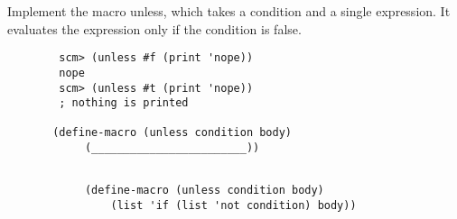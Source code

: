 \begin{blocksection}
    \question 
    Implement the macro unless, which takes a condition and a single expression.
    It evaluates the expression only if the condition is false.
    
    \begin{lstlisting}
        scm> (unless #f (print 'nope))
        nope
        scm> (unless #t (print 'nope))
        ; nothing is printed

       (define-macro (unless condition body)
            (________________________))

    \end{lstlisting}

    \begin{solution}[1in]
        \begin{lstlisting}

            (define-macro (unless condition body)
                (list 'if (list 'not condition) body))

        \end{lstlisting}
    \end{solution}
    
\end{blocksection}